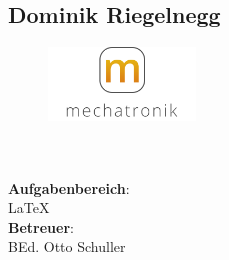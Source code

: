 \subsection*{Dominik Riegelnegg}
\begin{figure}
\begin{center}
  \includegraphics[width=0.35\textwidth]{fig/logoMecha}
\end{center}
\end{figure}
\mbox{}\\
\mbox{}\\
\textbf{Aufgabenbereich}:\\
\LaTeX{}\\
\textbf{Betreuer}:\\
BEd. Otto Schuller
\mbox{}\\
\mbox{}\\
\mbox{}\\
\mbox{}\\
\mbox{}\\
\newpage